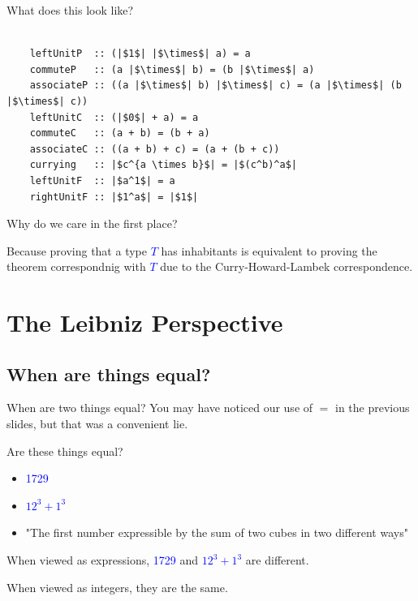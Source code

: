 \documentclass[tikz]{beamer}
\newcommand{\blue}[1]{\textcolor{blue}{#1}}
\newcommand{\mblue}[1]{\textcolor{blue}{$#1$}}
\theoremstyle{definition}
\begin{document}
\begin{frame}[fragile]
	What does this look like?
	
	\begin{center}
	\begin{verbatim}
	
	leftUnitP  :: (|$1$| |$\times$| a) = a
	commuteP   :: (a |$\times$| b) = (b |$\times$| a)
	associateP :: ((a |$\times$| b) |$\times$| c) = (a |$\times$| (b |$\times$| c))
	leftUnitC  :: (|$0$| + a) = a
	commuteC   :: (a + b) = (b + a)
	associateC :: ((a + b) + c) = (a + (b + c))
	currying   :: |$c^{a \times b}$| = |$(c^b)^a$|
	leftUnitF  :: |$a^1$| = a
	rightUnitF :: |$1^a$| = |$1$|
	\end{verbatim}
	
	\end{center}
\end{frame}

\frame
{ 
	Why do we care in the first place? 
}

\frame
{ 
	Because proving that a type \mblue{T} has inhabitants is equivalent to proving the theorem correspondnig with \mblue{T} due to the Curry-Howard-Lambek correspondence.
}



\section{The Leibniz Perspective}

\subsection{When are things equal?}
\frame
{
	When are two things equal? You may have noticed our use of $=$ in the previous slides, but that was a convenient lie.
}

\frame
{
	Are these things equal? 
	
	\begin{itemize}
		\item \blue{1729}
		\item \mblue{12^3 + 1^3}
		\item "The first number expressible by the sum of two cubes in two different ways"
	\end{itemize}
}

\frame
{
	When viewed as expressions, \blue{1729} and \mblue{12^3 + 1^3} are different.
}

\frame
{
	When viewed as integers, they are the same. 
}
\end{document}
